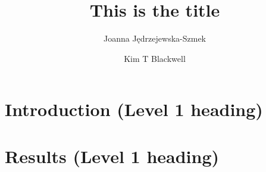 \documentclass[9pt,lineno]{elife}
\title{This is the title}
\author[1*]{Joanna Jędrzejewska-Szmek}
\author[2*]{Kim T Blackwell}
\affil[1]{Institution 1}
\affil[2]{Institution 2}
\begin{document}
\maketitle

\begin{abstract}
\end{abstract}


\section{Introduction (Level 1 heading)}




\section{Results (Level 1 heading)}



\end{document}
